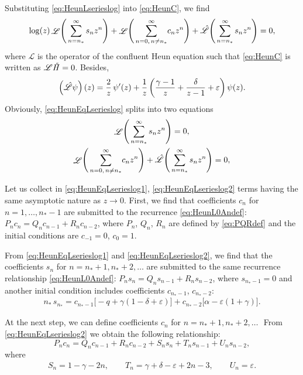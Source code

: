 \documentclass[11pt]{article}
\newcommand{\MF}[1]{\mathop{#1}\nolimits}
\def\nsp{n_*}%
\def\Lkr{\mathscr{L}}%
\def\HeunC{\displaystyle\setbox0=\hbox{\tiny\itshape\bfseries \kern1.52mm c}\wd0=0pt\ht0=0pt\dp0=0pt\MF{\textit{\hbox{\raise1.67ex\copy0}H\/}}}%
\begin{document}
Substituting \eqref{eq:HeunLserieslog} into \eqref{eq:HeunC}, we find
\begin{equation}
\log(z)\MF{\Lkr}\Biggl(\,\sum_{n=\nsp}^\infty s_n z^n\Biggr)+
\MF{\Lkr}\Biggl(\,\sum_{n=0,\,n\neq\nsp}^\infty\! c_n z^n\Biggr)+
\MF{\Hat{\Lkr}}\Biggl(\,\sum_{n=\nsp}^\infty s_n z^n\Biggr)=0,
\label{eq:HeunEqLserieslog}
\end{equation}
where $\Lkr$ is the operator of the confluent Heun equation such that \eqref{eq:HeunC} is
written as $\Lkr\!\HeunC=0$. Besides,
\[
\left(\Hat{\Lkr}\psi\right)(z)=\frac2z\MF{\psi'}(z)+\frac1z\left(
\frac{\gamma-1}{z}+\frac{\delta}{z-1}+\varepsilon\right)\MF{\psi}(z).
\]
Obviously, \eqref{eq:HeunEqLserieslog} splits into two equations
\begin{gather}
\MF{\Lkr}\Biggl(\,\sum_{n=\nsp}^\infty s_n
z^n\Biggr)=0,\label{eq:HeunEqLserieslog1}\\
\MF{\Lkr}\Biggl(\,\sum_{n=0,\,n\neq\nsp}^\infty\! c_n z^n\Biggr)+
\MF{\Hat{\Lkr}}\Biggl(\,\sum_{n=\nsp}^\infty s_n z^n\Biggr)=0,
\label{eq:HeunEqLserieslog2}
\end{gather}

Let us collect in \eqref{eq:HeunEqLserieslog1}, \eqref{eq:HeunEqLserieslog2} terms having the same asymptotic
nature as $z\to0$. First, we find that coefficients $c_n$ for $n=1,\ldots,\nsp-1$
are submitted to the recurrence \eqref{eq:HeunL0Andef}: $P_n c_n=Q_n c_{n-1}+R_n
c_{n-2}$, where $P_n$, $Q_n$, $R_n$ are defined by \eqref{eq:PQRdef} and the
initial conditions are $c_{-1}=0$, $c_0=1$.

From \eqref{eq:HeunEqLserieslog1} and
\eqref{eq:HeunEqLserieslog2}, we find that the coefficients $s_n$ for
$n=\nsp+1,\nsp+2,\ldots$ are submitted to the same recurrence relationship
\eqref{eq:HeunL0Andef}: $P_n s_n=Q_n s_{n-1}+R_n s_{n-2}$, where $s_{\nsp-1}=0$
and another initial condition includes coefficients $c_{\nsp-1}$, $c_{\nsp-2}$:
\begin{gather*}
\nsp\, s_{\nsp}=c_{\nsp-1}\bigl[-q+\gamma(1-\delta+\varepsilon)\bigr]+
c_{\nsp-2}\bigl[\alpha-\varepsilon(1+\gamma)\bigr].
\end{gather*}

At the next step, we can define coefficients $c_n$ for $n=\nsp+1,\nsp+2,\ldots$\,\
From \eqref{eq:HeunEqLserieslog2} we obtain the following relationship:
\begin{equation}
P_n c_n=Q_n c_{n-1}+R_n c_{n-2}+ S_n s_{n}+T_n s_{n-1}+U_n s_{n-2},
\label{eq:recurrlog}
\end{equation}
where
\begin{gather*}
S_n = 1-\gamma-2n,\qquad
T_n = \gamma+\delta-\varepsilon+2n-3,\qquad
U_n = \varepsilon.
\end{gather*}
\end{document}

